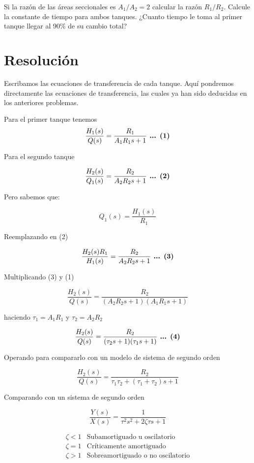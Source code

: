 \documentclass[
  letterpaper,
  DIV=11,
  numbers=noendperiod]{scrreprt}
\begin{document}
Si la razón de las áreas seccionales es \(A_1/A_2 = 2\) calcular la
razón \(R_1/R_2\). Calcule la constante de tiempo para ambos tanques.
¿Cuanto tiempo le toma al primer tanque llegar al 90\% de su cambio
total?

\hypertarget{resoluciuxf3n-2}{%
\section{Resolución}\label{resoluciuxf3n-2}}

Escribamos las ecuaciones de transferencia de cada tanque. Aquí
pondremos directamente las ecuaciones de transferencia, las cuales ya
han sido deducidas en los anteriores problemas.

Para el primer tanque tenemos \[
\frac{H_1(s)}{Q(s)}=\frac{R_1}{A_1R_1s+1}\space\space\space\space\textbf{ ... (1)}
\]

Para el segundo tanque

\[
\frac{H_2(s)}{Q_1(s)}=\frac{R_2}{A_2R_2s+1}\space\space\space\space\textbf{ ... (2)}
\]

Pero sabemos que:

\[
Q_1(s) = \frac{H_1(s)}{R_1}
\]

Reemplazando en (2)

\[
\frac{H_2(s)R_1}{H_1(s)}=\frac{R_2}{A_2R_2s+1}\space\space\space\space\textbf{ ... (3)}
\]

Multiplicando (3) y (1)

\[
\frac{H_2(s)}{Q(s)}=\frac{R_2}{(A_2R_2s+1)(A_1R_1s+1)}
\]

haciendo \(\tau_1 = A_1R_1\) y \(\tau_2=A_2R_2\)

\[
\frac{H_2(s)}{Q(s)}=\frac{R_2}{(\tau_2s+1)(\tau_1s+1)}\space\space\space\space\textbf{ ... (4)}
\]

Operando para compararlo con un modelo de sistema de segundo orden

\[
\frac{H_2(s)}{Q(s)}=\frac{R_2}{\tau_1\tau_2+(\tau_1+\tau_2)s+1}
\]

Comparando con un sistema de segundo orden

\[
\frac{Y(s)}{X(s)}=\frac{1}{\tau^2 s^2+2\zeta\tau s+1}
\]

\[
\begin{array}{ll}
\zeta<1 & \text{Subamortiguado u oscilatorio}\\
\zeta=1 & \text{Críticamente amortiguado}\\
\zeta>1 & \text{Sobreamortiguado o no oscilatorio}\\
\end{array}
\]
\end{document}
